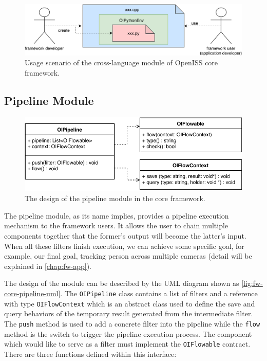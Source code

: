\begin{figure}
    \centering
    \includegraphics[scale=0.8]{figures/framework_core_cross_lang2.pdf}
    \caption
    {Usage scenario of the cross-language module of OpenISS core framework.}
    \label{fig:fw-core-cross-lang2}
\end{figure}

\subsection{Pipeline Module}
\label{sec:fw-design-core-pipeline}

\begin{figure}
    \includegraphics[width=\linewidth]{figures/framework_core_pipeline.pdf}
    \caption{The design of the pipeline module in the core framework.}
    \label{fig:fw-core-pipeline-uml}
\end{figure}

The pipeline module, as its name implies, provides a pipeline execution
mechanism to the framework users. It allows the user to chain multiple
components together that the former's output will become the latter's input.
When all these filters finish execution, we can achieve some specific goal, for
example, our final goal, tracking person across multiple cameras (detail will
be explained in \autoref{chap:fw-app}).

The design of the module can be described by the UML diagram shown as
\autoref{fig:fw-core-pipeline-uml}. The \texttt{OIPipeline} class contains a
list of filters and a reference with type \texttt{OIFlowContext} which is an
abstract class used to define the save and query behaviors of the temporary
result generated from the intermediate filter. The \texttt{push} method is used
to add a concrete filter into the pipeline while the \texttt{flow} method is the
switch to trigger the pipeline execution process.
The component which would like to serve as a filter must implement the
\texttt{OIFlowable} contract. There are three functions defined within this
interface:

